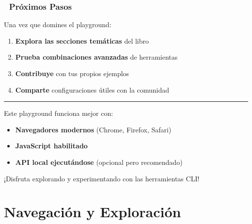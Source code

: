 \documentclass[
  11pt,
  letterpaper,
  oneside,
  openany]{scrbook}
\providecommand{\tightlist}{%
  \setlength{\itemsep}{0pt}\setlength{\parskip}{0pt}}
\begin{document}
\section{🚀 Próximos Pasos}\label{pruxf3ximos-pasos}

Una vez que domines el playground:

\begin{enumerate}
\def\labelenumi{\arabic{enumi}.}
\tightlist
\item
  \textbf{Explora las secciones temáticas} del libro
\item
  \textbf{Prueba combinaciones avanzadas} de herramientas
\item
  \textbf{Contribuye} con tus propios ejemplos
\item
  \textbf{Comparte} configuraciones útiles con la comunidad
\end{enumerate}

\begin{center}\rule{0.5\linewidth}{0.5pt}\end{center}

\begin{tcolorbox}[enhanced jigsaw, toprule=.15mm, bottomrule=.15mm, opacityback=0, coltitle=black, rightrule=.15mm, colframe=quarto-callout-important-color-frame, titlerule=0mm, opacitybacktitle=0.6, left=2mm, colback=white, bottomtitle=1mm, arc=.35mm, leftrule=.75mm, title=\textcolor{quarto-callout-important-color}{\faExclamation}\hspace{0.5em}{¡Importante!}, colbacktitle=quarto-callout-important-color!10!white, breakable, toptitle=1mm]

Este playground funciona mejor con:

\begin{itemize}
\tightlist
\item
  \textbf{Navegadores modernos} (Chrome, Firefox, Safari)
\item
  \textbf{JavaScript habilitado}
\item
  \textbf{API local ejecutándose} (opcional pero recomendado)
\end{itemize}

\end{tcolorbox}

¡Disfruta explorando y experimentando con las herramientas CLI! 🎉

\part{Navegación y Exploración}
\end{document}
